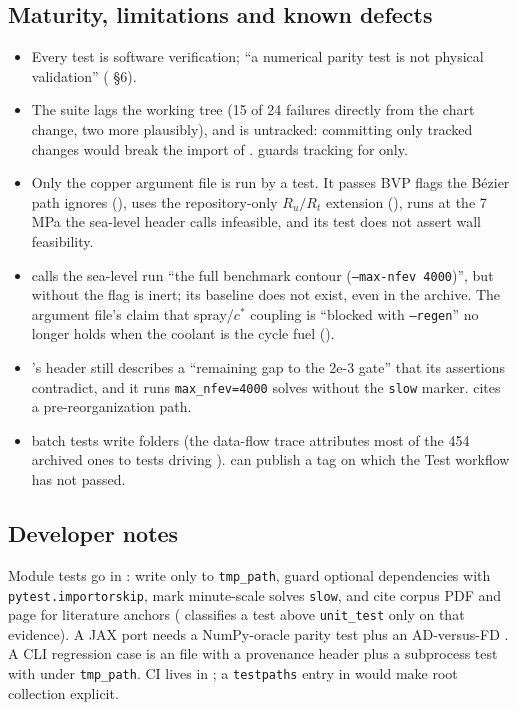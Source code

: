 \subsection{Maturity, limitations and known defects}
\begin{itemize}[nosep]
  \item Every test is software verification; ``a numerical parity test is not physical validation'' ( \S6).
  \item The suite lags the working tree (15 of 24 failures directly from the chart change, two more plausibly), and  is untracked: committing only tracked changes would break the import of .  guards tracking for  only.
  \item Only the copper argument file is run by a test. It passes BVP flags the B\'ezier path ignores (), uses the repository-only $R_u/R_t$ extension (), runs at the 7\,MPa the sea-level header calls infeasible, and its test does not assert wall feasibility.
  \item {} calls the sea-level run ``the full benchmark contour (\texttt{--max-nfev 4000})'', but without  the flag is inert; its baseline  does not exist, even in the archive. The argument file's claim that spray/$c^*$ coupling is ``blocked with \texttt{--regen}'' no longer holds when the coolant is the cycle fuel ().
  \item {}'s header still describes a ``remaining gap to the 2e-3 gate'' that its assertions contradict, and it runs \texttt{max\_nfev=4000} solves without the \texttt{slow} marker.  cites a pre-reorganization  path.
  \item {} batch tests write  folders (the data-flow trace attributes most of the 454 archived ones to tests driving ).  can publish a tag on which the Test workflow has not passed.
\end{itemize}

\subsection{Developer notes}
Module tests go in : write only to \texttt{tmp\_path}, guard optional dependencies with \texttt{pytest.importorskip}, mark minute-scale solves \texttt{slow}, and cite corpus PDF and page for literature anchors ( classifies a test above \texttt{unit\_test} only on that evidence). A JAX port needs a NumPy-oracle parity test plus an AD-versus-FD . A CLI regression case is an  file with a provenance header plus a subprocess test with  under \texttt{tmp\_path}. CI lives in ; a \texttt{testpaths} entry in  would make root collection explicit.
